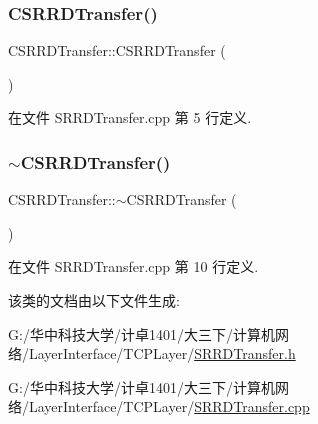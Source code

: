 \subsubsection{\texorpdfstring{C\+S\+R\+R\+D\+Transfer()}{CSRRDTransfer()}}
{\footnotesize\ttfamily C\+S\+R\+R\+D\+Transfer\+::\+C\+S\+R\+R\+D\+Transfer (\begin{DoxyParamCaption}{ }\end{DoxyParamCaption})}



在文件 S\+R\+R\+D\+Transfer.\+cpp 第 5 行定义.

\mbox{\label{class_c_s_r_r_d_transfer_a7bfdc212714609526efcd147a870259f}} 
\subsubsection{\texorpdfstring{$\sim$\+C\+S\+R\+R\+D\+Transfer()}{~CSRRDTransfer()}}
{\footnotesize\ttfamily C\+S\+R\+R\+D\+Transfer\+::$\sim$\+C\+S\+R\+R\+D\+Transfer (\begin{DoxyParamCaption}{ }\end{DoxyParamCaption})}



在文件 S\+R\+R\+D\+Transfer.\+cpp 第 10 行定义.



该类的文档由以下文件生成\+:\begin{DoxyCompactItemize}
\item 
G\+:/华中科技大学/计卓1401/大三下/计算机网络/\+Layer\+Interface/\+T\+C\+P\+Layer/\hyperlink{_s_r_r_d_transfer_8h}{S\+R\+R\+D\+Transfer.\+h}\item 
G\+:/华中科技大学/计卓1401/大三下/计算机网络/\+Layer\+Interface/\+T\+C\+P\+Layer/\hyperlink{_s_r_r_d_transfer_8cpp}{S\+R\+R\+D\+Transfer.\+cpp}\end{DoxyCompactItemize}
